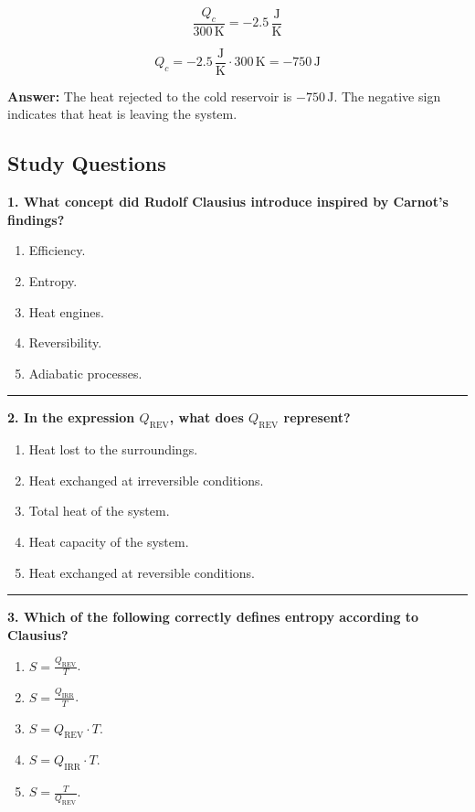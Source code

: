 \documentclass[
  9pt,
]{extbook}
\providecommand{\tightlist}{%
  \setlength{\itemsep}{0pt}\setlength{\parskip}{0pt}}
\theoremstyle{definition}
\theoremstyle{definition}
\theoremstyle{definition}
\theoremstyle{definition}
\theoremstyle{remark}
\begin{document}
\[\frac{Q_c}{300\,\text{K}} = -2.5\,\frac{\text{J}}{\text{K}}\]

\[Q_c = -2.5\,\frac{\text{J}}{\text{K}} \cdot 300\,\text{K} = -750\,\text{J}\]

\textbf{Answer:} The heat rejected to the cold reservoir is \(-750\,\text{J}\). The negative sign indicates that heat is leaving the system.

\subsection{Study Questions}\label{quest6}

\textbf{1. What concept did Rudolf Clausius introduce inspired by Carnot's findings?}

\begin{enumerate}
\def\labelenumi{\alph{enumi}.}
\tightlist
\item
  Efficiency.
\item
  Entropy.
\item
  Heat engines.
\item
  Reversibility.
\item
  Adiabatic processes.
\end{enumerate}

\begin{center}\rule{0.5\linewidth}{0.5pt}\end{center}

\textbf{2. In the expression \(Q_{\text{REV}}\), what does \(Q_{\text{REV}}\) represent?}

\begin{enumerate}
\def\labelenumi{\alph{enumi}.}
\tightlist
\item
  Heat lost to the surroundings.
\item
  Heat exchanged at irreversible conditions.
\item
  Total heat of the system.
\item
  Heat capacity of the system.
\item
  Heat exchanged at reversible conditions.
\end{enumerate}

\begin{center}\rule{0.5\linewidth}{0.5pt}\end{center}

\textbf{3. Which of the following correctly defines entropy according to Clausius?}

\begin{enumerate}
\def\labelenumi{\alph{enumi}.}
\tightlist
\item
  \(S = \frac{Q_{\text{REV}}}{T}\).
\item
  \(S = \frac{Q_{\text{IRR}}}{T}\).
\item
  \(S = Q_{\text{REV}} \cdot T\).
\item
  \(S = Q_{\text{IRR}} \cdot T\).
\item
  \(S = \frac{T}{Q_{\text{REV}}}\).
\end{enumerate}
\end{document}
